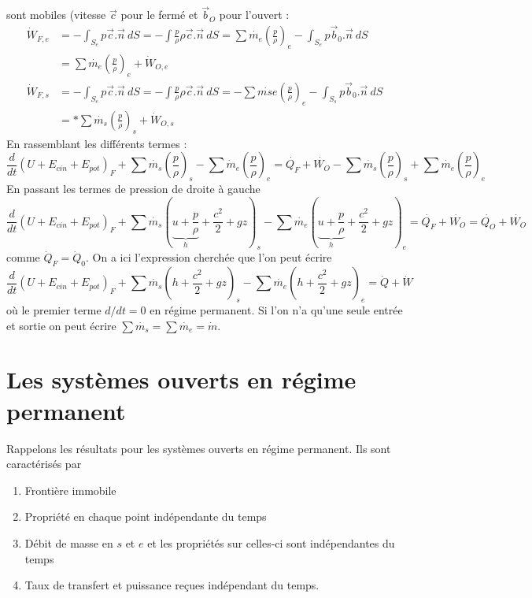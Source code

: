 sont mobiles (vitesse $\vec{c}$ pour le fermé et $\vec{b}_O$ pour l'ouvert :
\begin{equation}
\begin{array}{ll}
\dot{W}_{F,e} &= \displaystyle-\int_{S_e}p\vec{c}.\vec{n}\ dS = -\int \frac{p}{\rho}\rho
\vec{c}.\vec{n}\ dS = \sum\dot{m_e}\left(\frac{p}{\rho}\right)_e-\int_{S_e}
p\vec{b}_0.\vec{n}\ dS\\
 &= \displaystyle \sum\dot{m_e}\left(\frac{p}{\rho}\right)_e + \dot{W}_{O,e}\\
\dot{W}_{F,s} &= \displaystyle-\int_{S_e}p\vec{c}.\vec{n}\ dS = -\int \frac{p}{\rho}\rho
\vec{c}.\vec{n}\ dS = -\sum\dot{mse}\left(\frac{p}{\rho}\right)_e-\int_{S_s}
p\vec{b}_0.\vec{n}\ dS\\
 &= *\displaystyle \sum\dot{m_s}\left(\frac{p}{\rho}\right)_s + \dot{W}_{O,s}
\end{array}
\end{equation}
En rassemblant les différents termes :
\begin{equation}
\frac{d}{dt}\left(U+E_{cin}+E_{pot}\right)_F + \sum \dot{m_s}\left(\frac{p}{
\rho}\right)_s-\sum \dot{m}_e\left(\frac{p}{\rho}\right)_e = \dot{Q_F}+\dot{W_O}
-\sum\dot{m_s}\left(\frac{p}{\rho}\right)_s+\sum\dot{m_e}\left(\frac{p}{\rho}\right)_e
\end{equation}
En passant les termes de pression de droite à gauche
\begin{equation}
\frac{d}{dt}\left(U+E_{cin}+E_{pot}\right)_F + \sum \dot{m_s}\left(\underbrace{u + 
\frac{p}{\rho}}_{h} + \frac{c^2}{2}+gz\right)_s-\sum \dot{m_e}\left(\underbrace{u + 
\frac{p}{\rho}}_{h} + \frac{c^2}{2}+gz\right)_e = \dot{Q_F}+\dot{W_O} = \dot{Q_O}+
\dot{W_O}
\end{equation}
comme $\dot{Q}_F = \dot{Q}_0$. On a ici l'expression cherchée que l'on peut écrire 
\begin{equation}
\frac{d}{dt}\left(U+E_{cin}+E_{pot}\right)_F + \sum \dot{m_s}\left(h+\frac{c^2}{2}
+gz\right)_s-\sum \dot{m_e}\left(h+\frac{c^2}{2}+gz\right)_e = \dot{Q}+\dot{W}
\end{equation}
où le premier terme $d/dt=0$ en régime permanent. Si l'on n'a qu'une seule entrée 
et sortie on peut écrire $\sum \dot{m_s}=\sum \dot{m_e}=\dot{m}$.


\section{Les systèmes ouverts en régime permanent}
Rappelons les résultats pour les systèmes ouverts en régime permanent. Ils sont 
caractérisés par 
\begin{enumerate}
\item Frontière immobile
\item Propriété en chaque point indépendante du temps
\item Débit de masse en $s$ et $e$ et les propriétés sur celles-ci sont 
indépendantes du temps
\item Taux de transfert et puissance reçues indépendant du temps.
\end{enumerate}


